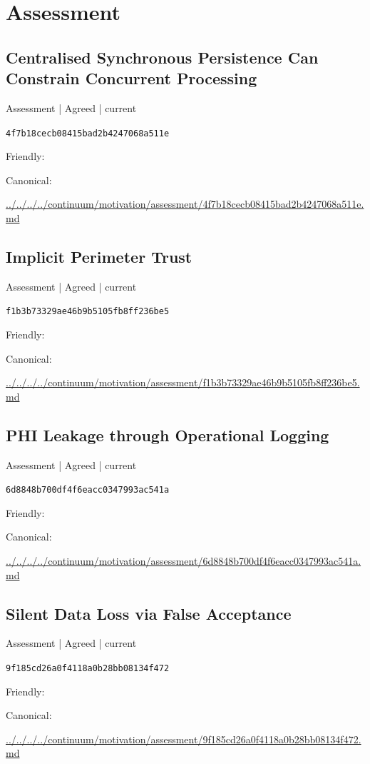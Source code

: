 \documentclass[10pt,a4paper]{article}
\begin{document}
\section*{Assessment}
\subsection*{Centralised Synchronous Persistence Can Constrain Concurrent Processing}
{\small Assessment | Agreed | current}\par
\texttt{4f7b18cecb08415bad2b4247068a511e}\par
Friendly: \par
Canonical: \par
{\footnotesize\url{../../../../continuum/motivation/assessment/4f7b18cecb08415bad2b4247068a511e.md}}\par
\subsection*{Implicit Perimeter Trust}
{\small Assessment | Agreed | current}\par
\texttt{f1b3b73329ae46b9b5105fb8ff236be5}\par
Friendly: \par
Canonical: \par
{\footnotesize\url{../../../../continuum/motivation/assessment/f1b3b73329ae46b9b5105fb8ff236be5.md}}\par
\subsection*{PHI Leakage through Operational Logging}
{\small Assessment | Agreed | current}\par
\texttt{6d8848b700df4f6eacc0347993ac541a}\par
Friendly: \par
Canonical: \par
{\footnotesize\url{../../../../continuum/motivation/assessment/6d8848b700df4f6eacc0347993ac541a.md}}\par
\subsection*{Silent Data Loss via False Acceptance}
{\small Assessment | Agreed | current}\par
\texttt{9f185cd26a0f4118a0b28bb08134f472}\par
Friendly: \par
Canonical: \par
{\footnotesize\url{../../../../continuum/motivation/assessment/9f185cd26a0f4118a0b28bb08134f472.md}}\par
\end{document}
